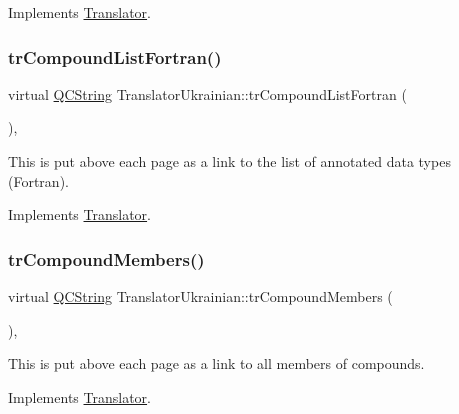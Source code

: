 Implements \mbox{\hyperlink{class_translator}{Translator}}.

\mbox{\label{class_translator_ukrainian_aa29b2d5efb318705bdca734eb5228674}} 
\subsubsection{\texorpdfstring{trCompoundListFortran()}{trCompoundListFortran()}}
{\footnotesize\ttfamily virtual \mbox{\hyperlink{class_q_c_string}{Q\+C\+String}} Translator\+Ukrainian\+::tr\+Compound\+List\+Fortran (\begin{DoxyParamCaption}{ }\end{DoxyParamCaption})\hspace{0.3cm}{\ttfamily [inline]}, {\ttfamily [virtual]}}

This is put above each page as a link to the list of annotated data types (Fortran). 

Implements \mbox{\hyperlink{class_translator}{Translator}}.

\mbox{\label{class_translator_ukrainian_a2819da66a6651159a1850e1773c42368}} 
\subsubsection{\texorpdfstring{trCompoundMembers()}{trCompoundMembers()}}
{\footnotesize\ttfamily virtual \mbox{\hyperlink{class_q_c_string}{Q\+C\+String}} Translator\+Ukrainian\+::tr\+Compound\+Members (\begin{DoxyParamCaption}{ }\end{DoxyParamCaption})\hspace{0.3cm}{\ttfamily [inline]}, {\ttfamily [virtual]}}

This is put above each page as a link to all members of compounds. 

Implements \mbox{\hyperlink{class_translator}{Translator}}.

\mbox{\label{class_translator_ukrainian_a1dfe165b4da40398711805662d08c5fc}} 
